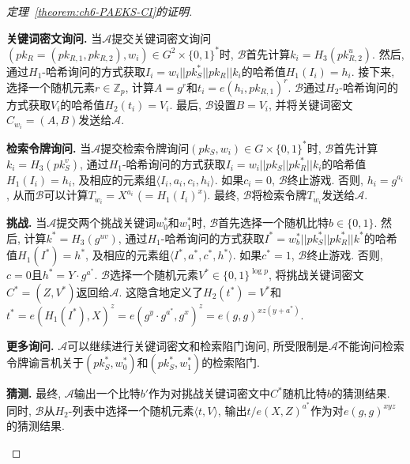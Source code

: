 \begin{proof}[定理~\ref{theorem:ch6-PAEKS-CI}的证明]
\begin{trivlist}
\item \textbf{关键词密文询问.} 当$\mathcal{A}$提交关键词密文询问$(pk_R = (pk_{R,1}, pk_{R,2}), w_i) \in G^2 \times\{0, 1\}^*$时, $\mathcal{B}$首先计算$k_i = H_3(pk_{R,2}^u)$. 然后, 通过$H_1$-哈希询问的方式获取$I_i = w_i||pk_S^*||pk_R||k_i$的哈希值$H_1(I_i) = h_i$. 接下来, 选择一个随机元素$r \in \mathbb{Z}_p$, 计算$A = g^r$和$t_i = e(h_i, pk_{R,1})^r$. $\mathcal{B}$通过$H_2$-哈希询问的方式获取$V_i$的哈希值$H_2(t_i)=V_i$. 最后, $\mathcal{B}$设置$B = V_i$, 并将关键词密文$C_{w_i} = (A, B)$发送给$\mathcal{A}$.

\item \textbf{检索令牌询问.} 当$\mathcal{A}$提交检索令牌询问$(pk_S, w_i) \in G \times \{0, 1\}^*$时, $\mathcal{B}$首先计算$k_i = H_3(pk_S^v)$, 通过$H_1$-哈希询问的方式获取$I_i = w_i||pk_S||pk_R^*||k_i$的哈希值$H_1(I_i) = h_i$, 及相应的元素组$\langle I_i, a_i, c_i, h_i\rangle$. 如果$c_i = 0$, $\mathcal{B}$终止游戏. 否则, $h_i = g^{a_i}$, 从而$\mathcal{B}$可以计算$T_{w_i} = X^{a_i}$ ($ =H_1(I_i)^x$). 最终, $\mathcal{B}$将检索令牌$T_{w_i}$发送给$\mathcal{A}$.

\item \textbf{挑战.} 当$\mathcal{A}$提交两个挑战关键词$w_0^*$和$w_1^*$时, $\mathcal{B}$首先选择一个随机比特$b \in \{0, 1\}$. 然后, 计算$k^* = H_3(g^{uv})$, 通过$H_1$-哈希询问的方式获取$I^* = w_b^*||pk_S^*||pk_R^*||k^*$的哈希值$H_1(I^*) = h^*$, 及相应的元素组$\langle I^*, a^*, c^*, h^*\rangle$. 如果$c^* = 1$, $\mathcal{B}$终止游戏. 否则, $c = 0$且$h^* = Y \cdot g^{a^*}$. $\mathcal{B}$选择一个随机元素$V^* \in \{0, 1\}^{\log p}$, 将挑战关键词密文$C^* = (Z, V^*)$返回给$\mathcal{A}$. 这隐含地定义了$H_2(t^*) = V^*$和$t^* = e(H_1(I^*), X)^z = e(g^y \cdot g^{a^*}, g^x)^z = e(g, g)^{xz(y+a^*)}$.

\item \textbf{更多询问.} $\mathcal{A}$可以继续进行关键词密文和检索陷门询问, 所受限制是$\mathcal{A}$不能询问检索令牌谕言机关于$(pk_S^*, w_0^*)$和$(pk_S^*, w_1^*)$的检索陷门.

\item \textbf{猜测.} 最终, $\mathcal{A}$输出一个比特$b'$作为对挑战关键词密文中$C^*$随机比特$b$的猜测结果. 同时, $\mathcal{B}$从$H_2$-列表中选择一个随机元素$\langle t, V\rangle$, 输出$t / e(X, Z)^{a^*}$作为对$e(g, g)^{xyz}$的猜测结果. 
\end{trivlist}


\end{proof}
